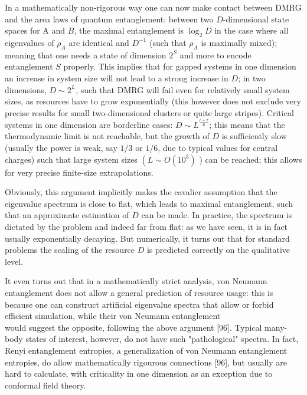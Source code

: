 \documentclass[12pt]{article}
\begin{document}
In a mathematically non-rigorous way one can now make contact between DMRG and the area laws of quantum entanglement: between two $D$-dimensional state spaces for A and $B$, the maximal entanglement is $\log _{2} D$ in the case where all eigenvalues of $\rho_{A}$ are identical and $D^{-1}$ (such that $\rho_{A}$ is maximally mixed); meaning that one needs a state of dimension $2^{S}$ and more to encode entanglement $S$ properly. This implies that for gapped systems in one dimension an increase in system size will not lead to a strong increase in $D$; in two dimensions, $D \sim 2^{L}$, such that DMRG will fail even for relatively small system sizes, as resources have to grow exponentially (this however does not exclude very precise results for small two-dimensional clusters or quite large stripes). Critical systems in one dimension are borderline cases: $D \sim L^{\frac{c+\tau}{6}}$; this means that the thermodynamic limit is not reachable, but the growth of $D$ is sufficiently slow (usually the power is weak, say $1 / 3$ or $1 / 6$, due to typical values for central charges) such that large system sizes $\left(L \sim O\left(10^{3}\right)\right.$ ) can be reached; this allows for very precise finite-size extrapolations.

Obviously, this argument implicitly makes the cavalier assumption that the eigenvalue spectrum is close to flat, which leads to maximal entanglement, such that an approximate estimation of $D$ can be made. In practice, the spectrum is dictated by the problem and indeed far from flat: as we have seen, it is in fact usually exponentially decaying. But numerically, it turns out that for standard problems the scaling of the resource $D$ is predicted correctly on the qualitative level.

It even turns out that in a mathematically strict analysis, von Neumann entanglement does not allow a general prediction of resource usage: this is because one can construct artificial eigenvalue spectra that allow or forbid efficient simulation, while their von Neumann entanglement\\
would suggest the opposite, following the above argument [96]. Typical many-body states of interest, however, do not have such "pathological" spectra. In fact, Renyi entanglement entropies, a generalization of von Neumann entanglement entropies, do allow mathematically rigourous connections [96], but usually are hard to calculate, with criticality in one dimension as an exception due to conformal field theory.
\end{document}
